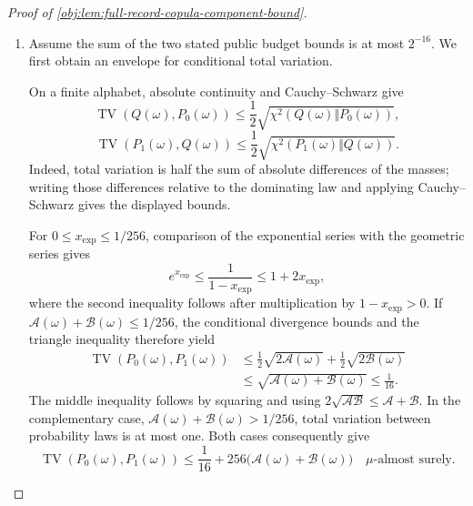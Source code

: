 \begin{proof}[Proof of \cref{obj:lem:full-record-copula-component-bound}]
\begin{enumerate}
For a fixed latent draw and covariate \(x\), the flag and fair-label weights give
\[
\Pr_\nu\left(
 A=\frac{1+z^{\mathrm t}}2,\,
 Y=z^{\mathrm y}L\mid x
 \right)
 =
 \frac{\varepsilon}{4}
 \left\{
 1+z^{\mathrm t}\xi(x)+z^{\mathrm y}\upsilon(x)
   +z^{\mathrm t}z^{\mathrm y}\zeta(x)
 \right\},
\]
and, summing the retained outcome-sign label when the flag is zero,
\[
\Pr_\nu\left(
 A=\frac{1+z^{\mathrm t}}2,\,
 Y=0\mid x
 \right)
 =
 \sum_{z^{\mathrm y}\in\{-1,1\}}
 \frac{1-\varepsilon}{4}(1+z^{\mathrm t}\xi(x))
 =
 \frac{1-\varepsilon}{2}(1+z^{\mathrm t}\xi(x)).
\]
These are exactly the categories of \cref{obj:def:marked-table}. Independent record generation conditional on the latent draw, followed by its prior average, therefore proves
\[
(\mu\otimes P_0)\circ\mathsf O_L^{-1}=\mathbb P_0,
\qquad
(\mu\otimes P_1)\circ\mathsf O_L^{-1}=\mathbb P_1.
\]

\item
Assume the sum of the two stated public budget bounds is at most \(2^{-16}\). We first obtain an envelope for conditional total variation.

On a finite alphabet, absolute continuity and Cauchy--Schwarz give
\[
\operatorname{TV}(Q(\omega),P_0(\omega))
 \le\frac12\sqrt{\chi^2(Q(\omega)\Vert P_0(\omega))},
\]
\[
\operatorname{TV}(P_1(\omega),Q(\omega))
 \le\frac12\sqrt{\chi^2(P_1(\omega)\Vert Q(\omega))}.
\]
Indeed, total variation is half the sum of absolute differences of the masses; writing those differences relative to the dominating law and applying Cauchy--Schwarz gives the displayed bounds.

For \(0\le x_{\mathrm{exp}}\le1/256\), comparison of the exponential series with the geometric series gives
\[
e^{x_{\mathrm{exp}}}
 \le\frac1{1-x_{\mathrm{exp}}}
 \le1+2x_{\mathrm{exp}},
\]
where the second inequality follows after multiplication by
\(1-x_{\mathrm{exp}}>0\). If
\(\mathcal A(\omega)+\mathcal B(\omega)\le1/256\), the conditional divergence bounds and the triangle inequality therefore yield
\[
\begin{aligned}
\operatorname{TV}(P_0(\omega),P_1(\omega))
 &\le
 \frac12\sqrt{2\mathcal A(\omega)}
 +\frac12\sqrt{2\mathcal B(\omega)}\\
 &\le\sqrt{\mathcal A(\omega)+\mathcal B(\omega)}
 \le\frac1{16}.
\end{aligned}
\]
The middle inequality follows by squaring and using
\(2\sqrt{\mathcal A\mathcal B}\le\mathcal A+\mathcal B\).
In the complementary case,
\(\mathcal A(\omega)+\mathcal B(\omega)>1/256\), total variation between probability laws is at most one. Both cases consequently give
\[
\operatorname{TV}(P_0(\omega),P_1(\omega))
 \le\frac1{16}
      +256\bigl(\mathcal A(\omega)+\mathcal B(\omega)\bigr)
\quad\mu\text{-almost surely}.
\]


\end{enumerate}
\end{proof}
